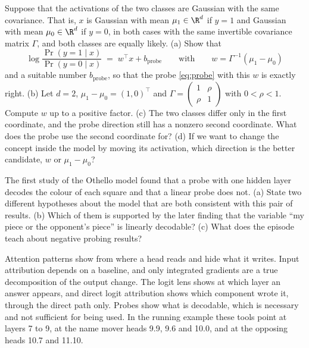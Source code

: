 \begin{exercise}\label{ex:lda}
Suppose that the activations of the two classes are Gaussian with the same covariance. That is, $x$ is Gaussian
with mean $\mu_1\in\R^d$ if $y=1$ and Gaussian with mean $\mu_0\in\R^d$ if $y=0$, in both cases with the same
invertible covariance matrix $\Gamma$, and both classes are equally likely. (a) Show
that
\[
\log\frac{\Pr(y=1\mid x)}{\Pr(y=0\mid x)} \;=\; w^\top x+b_{\mathrm{probe}}\qquad\text{with}\qquad w=\Gamma^{-1}(\mu_1-\mu_0)
\]
and a suitable number $b_{\mathrm{probe}}$, so that the probe \eqref{eq:probe} with this $w$ is exactly right.
(b) Let $d=2$, $\mu_1-\mu_0=(1,0)^\top$ and $\Gamma=\begin{pmatrix}1&\rho\\ \rho&1\end{pmatrix}$ with $0<\rho<1$.
Compute $w$ up to a positive factor. (c) The two classes differ only in the first coordinate, and the probe
direction still has a nonzero second coordinate. What does the probe use the second coordinate for? (d) If we
want to change the concept inside the model by moving its activation, which direction is the better candidate,
$w$ or $\mu_1-\mu_0$?
\end{exercise}

\begin{exercise}\label{ex:othello}
The first study of the Othello model found that a probe with one hidden layer decodes the colour of each square
and that a linear probe does not. (a) State two different hypotheses about the model that are both consistent
with this pair of results. (b) Which of them is supported by the later finding that the variable ``my piece or
the opponent's piece'' is linearly decodable? (c) What does the episode teach about negative probing results?
\end{exercise}

\begin{takeaways}
Attention patterns show from where a head reads and hide what it writes. Input attribution depends on a
baseline, and only integrated gradients are a true decomposition of the output change. The logit lens shows at
which layer an answer appears, and direct logit attribution shows which component wrote it, through the direct
path only. Probes show what is decodable, which is necessary and not sufficient for being used. In the running
example these tools point at layers 7 to 9, at the name mover heads 9.9, 9.6 and 10.0, and at the opposing heads
10.7 and 11.10.
\end{takeaways}

